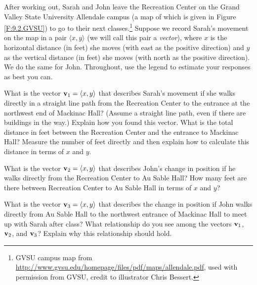 \begin{pa} \label{PA:9.2}
After working out, Sarah and John leave the Recreation Center on the Grand Valley State University Allendale campus (a map of which is given in Figure \ref{F:9.2.GVSU}) to go to their next classes.\footnote{GVSU campus map from \url{http://www.gvsu.edu/homepage/files/pdf/maps/allendale.pdf}, used with permission from GVSU, credit to illustrator Chris Bessert.}  Suppose we record Sarah's movement on the map in a pair $\langle x, y \rangle$ (we will call this pair a \emph{vector}), where $x$ is the horizontal distance (in feet) she moves (with east as the positive direction) and $y$ as the vertical distance (in feet) she moves (with north as the positive direction). We do the same for John. Throughout, use the legend to estimate your responses as best you can. 

    \ba
   \item What is the vector $\mathbf{v}_1 = \langle x , y \rangle$ that describes Sarah's movement if she walks directly in a straight line path from the Recreation Center to the entrance at the northwest end of Mackinac Hall? (Assume a straight line path, even if there are buildings in the way.) Explain how you found this vector. What is the total distance in feet between the Recreation Center and the entrance to Mackinac Hall?  Measure the number of feet directly and then explain how to calculate this distance in terms of $x$ and $y$.



    \item What is the vector $\mathbf{v}_2 = \langle x , y \rangle$ that describes John's change in position if he walks directly from the Recreation Center to Au Sable Hall? How many feet are there between Recreation Center to Au Sable Hall in terms of $x$ and $y$?



    \item What is the vector $\mathbf{v}_3 = \langle x , y \rangle$ that describes the change in position if John walks directly from Au Sable Hall to the northwest entrance of Mackinac Hall to meet up with Sarah after class? What relationship do you see among the vectors $\mathbf{v}_1$, $\mathbf{v}_2$, and $\mathbf{v}_3$? Explain why this relationship should hold.



	\ea


\end{pa} 

